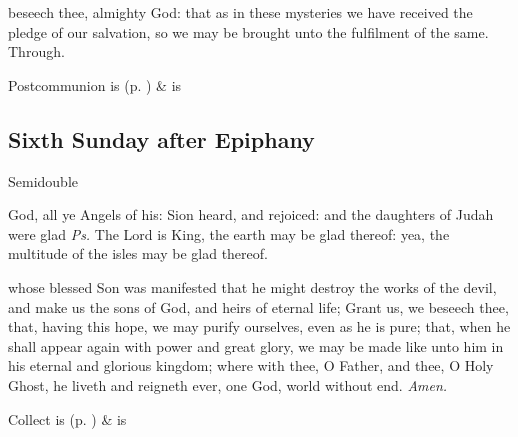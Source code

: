 \vspace{-0.25\baselineskip}

\postcommunion\label{EpiphanyVPostcommunion}
 beseech thee, almighty God: that as in these mysteries we have received the pledge of our salvation, so we may be brought unto the fulfilment of the same. Through.
\begin{rubric}
     Postcommunion is  (p. \pageref{SPSaints}) \&  is 
\end{rubric}


\clearpage
\subsection{Sixth Sunday after Epiphany}
\begin{inhead}
{Semidouble}
\end{inhead}

\vspace{-0.4\baselineskip}

\introit
{} God, all ye Angels of his: Sion heard, and rejoiced: and the daughters of Judah were glad \textit{Ps.} The Lord is King, the earth may be glad thereof: yea, the multitude of the isles may be glad thereof.

\vspace{-0.3\baselineskip}

\collect
{} whose blessed Son was manifested that he might destroy the works of the devil, and make us the sons of God, and heirs of eternal life; Grant us, we beseech thee, that, having this hope, we may purify ourselves, even as he is pure; that, when he shall appear again with power and great glory, we may be made like unto him in his eternal and glorious kingdom; where with thee, O Father, and thee, O Holy Ghost, he liveth and reigneth ever, one God, world without end. \textit{Amen.}
\begin{rubric}
     Collect is  (p. \pageref{SPSaints}) \&  is 
\end{rubric}

\vspace{-0.3\baselineskip}

